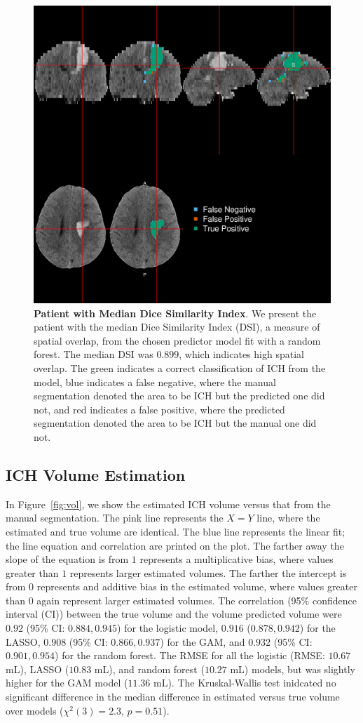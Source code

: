 \documentclass{elsarticle_nonatbib}\usepackage[]{graphicx}\usepackage[]{color}
\begin{document}
\begin{figure}
\centering
\includegraphics[width=0.75\linewidth,keepaspectratio]{Reseg_Figure_DSI_Quantile_050_native.png}
\caption{{\bf Patient with Median Dice Similarity Index}. We present the patient with the median Dice Similarity Index (DSI), a measure of spatial overlap, from the chosen predictor model fit with a random forest.  The median DSI was $0.899$, which indicates high spatial overlap. The green indicates a correct classification of ICH from the model, blue indicates a false negative, where the manual segmentation denoted the area to be ICH but the predicted one did not, and red indicates a false positive, where the predicted segmentation denoted the area to be ICH but the manual one did not. }
\label{fig:dice_img}
\end{figure}

\subsection{ICH Volume Estimation}
In Figure~\ref{fig:vol}, we show the estimated ICH volume versus that from the manual segmentation.  The pink line represents the $X = Y$ line, where the estimated and true volume are identical.  The blue line represents the linear fit; the line equation and correlation are printed on the plot.  The farther away the slope of the equation is from $1$ represents a multiplicative bias, where values greater than $1$ represents larger estimated volumes.  The farther the intercept is from $0$ represents and additive bias in the estimated volume, where values greater than $0$ again represent larger estimated volumes.  The correlation (95\% confidence interval (CI)) between the true volume and the volume predicted volume were $0.92$ (95\% CI: $0.884, 0.945$) for the logistic model, 
$0.916$ ($0.878, 0.942$) for the LASSO, 
$0.908$ (95\% CI: $0.866, 0.937$) for the GAM, and  
$0.932$ (95\% CI: $0.901, 0.954$) for the random forest.  The RMSE for all the logistic (RMSE: $10.67$ mL), LASSO ($10.83$ mL), and random forest ($10.27$ mL) models, but was slightly higher for the GAM model ($11.36$ mL).  The  Kruskal-Wallis test inidcated no significant difference in the median difference in estimated versus true volume over models ($\chi^{2}(3)=2.3$, $p = 0.51$).  
\end{document}
